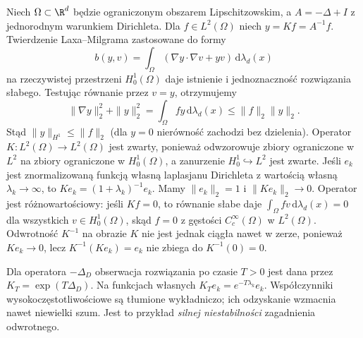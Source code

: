 \begin{przyklad}
\label{ex:pde32-elliptic-inverse}
Niech $\Omega\subset\R^d$ będzie ograniczonym obszarem
Lipschitzowskim, a $A=-\Delta+I$ z jednorodnym warunkiem
Dirichleta. Dla $f\in L^2(\Omega)$ niech $y=Kf=A^{-1}f$.
Twierdzenie Laxa--Milgrama zastosowane do formy
\[
 b(y,v)=\int_\Omega(\nabla y\cdot\nabla v+yv)
 \,\mathrm d\lambda_d(x)
\]
na rzeczywistej przestrzeni $H_0^1(\Omega)$ daje
istnienie i jednoznaczność rozwiązania słabego.
Testując równanie przez $v=y$, otrzymujemy
\[
 \|\nabla y\|_2^2+\|y\|_2^2
 =\int_\Omega fy\,\mathrm d\lambda_d(x)
 \le\|f\|_2\|y\|_2.
\]
Stąd $\|y\|_{H^1}\le\|f\|_2$ (dla $y=0$
nierówność zachodzi bez dzielenia).
Operator $K:L^2(\Omega)\to L^2(\Omega)$ jest zwarty,
ponieważ odwzorowuje zbiory ograniczone w $L^2$
na zbiory ograniczone w $H_0^1(\Omega)$, a zanurzenie
$H_0^1\hookrightarrow L^2$ jest zwarte.
Jeśli $e_k$ jest znormalizowaną funkcją własną laplasjanu
Dirichleta z wartością własną $\lambda_k\to\infty$, to
$Ke_k=(1+\lambda_k)^{-1}e_k$. Mamy
$\|e_k\|_2=1$ i $\|Ke_k\|_2\to0$.
Operator jest różnowartościowy: jeśli $Kf=0$,
to równanie słabe daje $\int_\Omega fv\,\mathrm d\lambda_d(x)=0$
dla wszystkich $v\in H_0^1(\Omega)$, skąd $f=0$
z gęstości $C_c^\infty(\Omega)$ w $L^2(\Omega)$.
Odwrotność $K^{-1}$ na obrazie $K$ nie jest jednak
ciągła nawet w zerze, ponieważ $Ke_k\to0$,
lecz $K^{-1}(Ke_k)=e_k$ nie zbiega do
$K^{-1}(0)=0$.
\end{przyklad}

\begin{uwaga}
Dla operatora $-\Delta_D$ obserwacja rozwiązania po czasie
$T>0$ jest dana przez $K_T=\exp(T\Delta_D)$.
Na funkcjach własnych $K_Te_k=e^{-T\lambda_k}e_k$.
Współczynniki wysokoczęstotliwościowe są tłumione
wykładniczo; ich odzyskanie wzmacnia nawet niewielki szum.
Jest to przykład \emph{silnej niestabilności} zagadnienia odwrotnego.
\end{uwaga}


